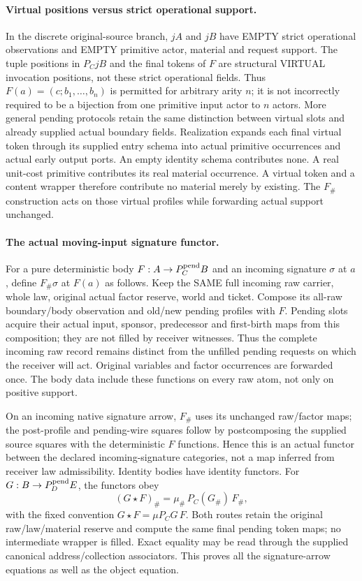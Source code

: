 \documentclass[11pt]{article}
\begin{document}
\paragraph{Virtual positions versus strict operational support.}
In the discrete original-source branch, $jA$ and $jB$ have EMPTY strict operational observations and EMPTY primitive actor, material and request support. The tuple positions in $P_CjB$ and the final tokens of $F$ are structural VIRTUAL invocation positions, not these strict operational fields. Thus $F(a)=(c;b_1,\ldots,b_n)$ is permitted for arbitrary arity $n$; it is not incorrectly required to be a bijection from one primitive input actor to $n$ actors. More general pending protocols retain the same distinction between virtual slots and already supplied actual boundary fields. Realization expands each final virtual token through its supplied entry schema into actual primitive occurrences and actual early output ports. An empty identity schema contributes none. A real unit-cost primitive contributes its real material occurrence. A virtual token and a content wrapper therefore contribute no material merely by existing. The $F_\#$ construction acts on those virtual profiles while forwarding actual support unchanged.

\paragraph{The actual moving-input signature functor.}
For a pure deterministic body $F:A\to P_C^{\rm pend}B$ and an incoming signature $\sigma$ at $a$, define $F_\#\sigma$ at $F(a)$ as follows. Keep the SAME full incoming raw carrier, whole law, original actual factor reserve, world and ticket. Compose its all-raw boundary/body observation and old/new pending profiles with $F$. Pending slots acquire their actual input, sponsor, predecessor and first-birth maps from this composition; they are not filled by receiver witnesses. Thus the complete incoming raw record remains distinct from the unfilled pending requests on which the receiver will act. Original variables and factor occurrences are forwarded once. The body data include these functions on every raw atom, not only on positive support.

On an incoming native signature arrow, $F_\#$ uses its unchanged raw/factor maps; the post-profile and pending-wire squares follow by postcomposing the supplied source squares with the deterministic $F$ functions. Hence this is an actual functor between the declared incoming-signature categories, not a map inferred from receiver law admissibility. Identity bodies have identity functors. For $G:B\to P_D^{\rm pend}E$, the functors obey
\[
 (G\star F)_\#=\mu_\#\,P_C(G_\#)\,F_\#,                 \tag{19}
\]
with the fixed convention $G\star F=\mu P_CG\,F$. Both routes retain the original raw/law/material reserve and compute the same final pending token maps; no intermediate wrapper is filled. Exact equality may be read through the supplied canonical address/collection associators. This proves all the signature-arrow equations as well as the object equation.
\end{document}
